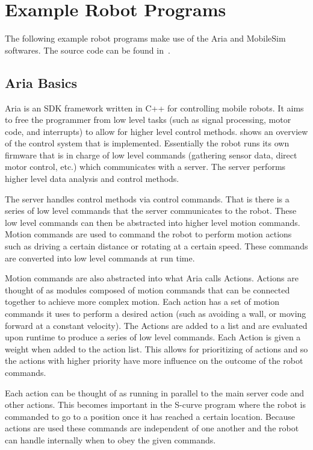 \documentclass[main.tex]{subfiles}
\begin{document}
\section{Example Robot Programs}
The following example robot programs make use of the Aria and MobileSim
softwares. The source code can be found in~.

\subsection{Aria Basics}

Aria\cite{aria} is an SDK framework written in C++ for controlling mobile
robots. It aims to free the programmer from low level tasks (such as signal
processing, motor code, and interrupts) to allow for higher level control
methods.   shows an overview of the control system that is
implemented.  Essentially the robot runs its own firmware that is in charge of
low level commands (gathering sensor data, direct motor control, etc.) which
communicates with a server. The server performs higher level data analysis and
control methods. 

The server handles control methods via control commands. That is there is a
series of low level commands that the server communicates to the robot. These
low level commands can then be abstracted into higher level motion commands.
Motion commands are used to command the robot to perform motion actions such as
driving a certain distance or rotating at a certain speed. These commands are
converted into low level commands at run time.

Motion commands are also abstracted into what Aria calls Actions. Actions are
thought of as modules composed of motion commands that can be connected together
to achieve more complex motion. Each action has a set of motion commands it uses
to perform a desired action (such as avoiding a wall, or moving forward at a
constant velocity).  The Actions are added to a list and are evaluated upon
runtime to produce a series of low level commands. Each Action is given a weight
when added to the action list. This allows for prioritizing of actions and so
the actions with higher priority have more influence on the outcome of the robot
commands.

Each action can be thought of as running in parallel to the main server code and
other actions. This becomes important in the S-curve program where the robot is
commanded to go to a position once it has reached a certain location. Because
actions are used these commands are independent of one another and the robot can
handle internally when to obey the given commands. 
\end{document}
